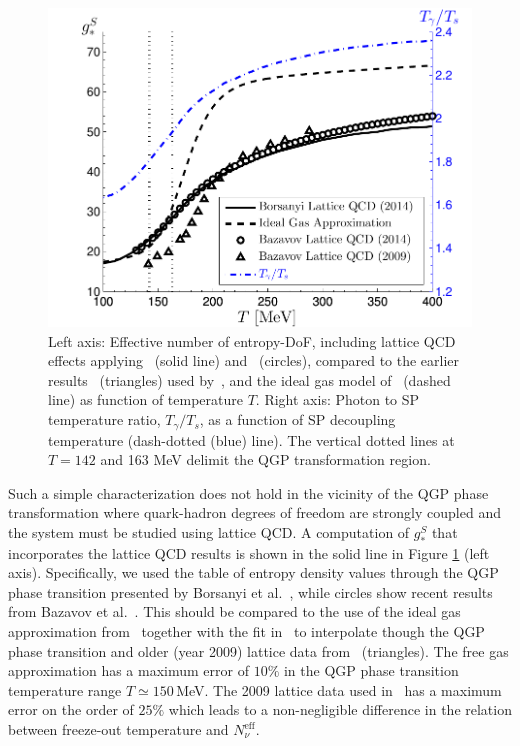 \begin{figure}
\centerline{\includegraphics[width=0.9\linewidth]{04-birrell/ModelIndStudy/Figures/gS_T_ratio.pdf}}
\caption{Left axis: Effective number of entropy-DoF, including lattice QCD effects applying~\cite{Borsanyi:2013bia} (solid line) and~\cite{HotQCD:2014kol} (circles), compared to the earlier results~\cite{Bazavov:2009zn} (triangles) used by~\cite{Anchordoqui:2011nh}, and the ideal gas model of~\cite{Coleman:2003hs} (dashed line) as function of temperature $T$. Right axis: Photon to SP temperature ratio, $T_\gamma/T_s$, as a function of SP decoupling temperature (dash-dotted (blue) line). The vertical dotted lines at $T=142$ and 163 MeV delimit the QGP transformation region. \label{fig:gS}}
 \end{figure}

Such a simple characterization does not hold in the vicinity of the QGP phase transformation where quark-hadron degrees of freedom are strongly coupled and the system must be studied using lattice QCD. A computation of $g_*^S$ that incorporates the lattice QCD results is shown in the solid line in Figure \ref{fig:gS} (left axis). Specifically, we used the table of entropy density values through the QGP phase transition presented by Borsanyi et al.~\cite{Borsanyi:2013bia}, while circles show recent results from Bazavov et al.~\cite{HotQCD:2014kol}. This should be compared to the use of the ideal gas approximation from~\cite{Coleman:2003hs} together with the fit in~\cite{Wantz:2009it} to interpolate though the QGP phase transition and older (year 2009) lattice data from~\cite{Bazavov:2009zn} (triangles). The free gas approximation has a maximum error of $10\%$ in the QGP phase transition temperature range $T\simeq 150$\,MeV. The 2009 lattice data used in~\cite{Anchordoqui:2011nh} has a maximum error on the order of $25\%$ which leads to a non-negligible difference in the relation between freeze-out temperature and $N^{\text{eff}}_{\nu}$.

